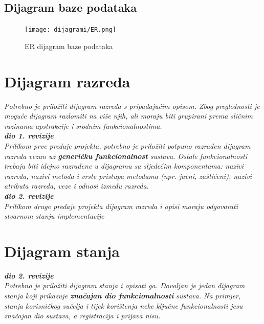         			\subsection{Dijagram baze podataka}
        				\begin{figure}[H]
        					\texttt{[image: dijagrami/ER.png]} %
        					\centering
        					\caption{ER dijagram baze podataka}
        					\label{fig:er}
        				\end{figure}

        			\eject
			
			
		\section{Dijagram razreda}
		
			\textit{Potrebno je priložiti dijagram razreda s pripadajućim opisom. Zbog preglednosti je moguće dijagram razlomiti na više njih, ali moraju biti grupirani prema sličnim razinama apstrakcije i srodnim funkcionalnostima.}\\
			
			\textbf{\textit{dio 1. revizije}}\\
			
			\textit{Prilikom prve predaje projekta, potrebno je priložiti potpuno razrađen dijagram razreda vezan uz \textbf{generičku funkcionalnost} sustava. Ostale funkcionalnosti trebaju biti idejno razrađene u dijagramu sa sljedećim komponentama: nazivi razreda, nazivi metoda i vrste pristupa metodama (npr. javni, zaštićeni), nazivi atributa razreda, veze i odnosi između razreda.}\\
			
			\textbf{\textit{dio 2. revizije}}\\			
			
			\textit{Prilikom druge predaje projekta dijagram razreda i opisi moraju odgovarati stvarnom stanju implementacije}
			
			
			
			\eject
		
		\section{Dijagram stanja}
			
			
			\textbf{\textit{dio 2. revizije}}\\
			
			\textit{Potrebno je priložiti dijagram stanja i opisati ga. Dovoljan je jedan dijagram stanja koji prikazuje \textbf{značajan dio funkcionalnosti} sustava. Na primjer, stanja korisničkog sučelja i tijek korištenja neke ključne funkcionalnosti jesu značajan dio sustava, a registracija i prijava nisu. }
			
